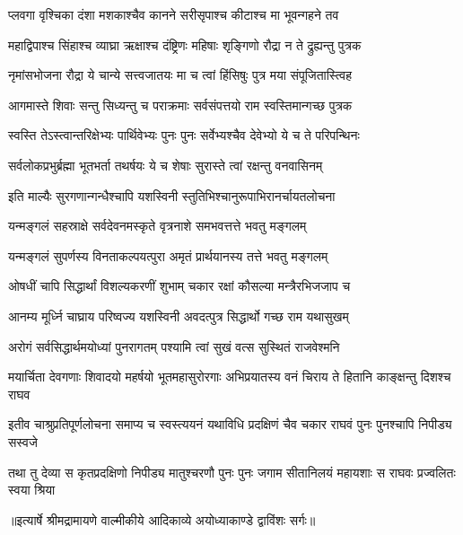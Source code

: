 \twolineshloka
{प्लवगा वृश्चिका दंशा मशकाश्चैव कानने}
{सरीसृपाश्च कीटाश्च मा भूवन्गहने तव} %

\twolineshloka
{महाद्विपाश्च सिंहाश्च व्याघ्रा ऋक्षाश्च दंष्ट्रिणः}
{महिषाः शृङ्गिणो रौद्रा न ते द्रुह्यन्तु पुत्रक} %

\twolineshloka
{नृमांसभोजना रौद्रा ये चान्ये सत्त्वजातयः}
{मा च त्वां हिंसिषुः पुत्र मया संपूजितास्त्विह} %

\twolineshloka
{आगमास्ते शिवाः सन्तु सिध्यन्तु च पराक्रमाः}
{सर्वसंपत्तयो राम स्वस्तिमान्गच्छ पुत्रक} %

\twolineshloka
{स्वस्ति तेऽस्त्वान्तरिक्षेभ्यः पार्थिवेभ्यः पुनः पुनः}
{सर्वेभ्यश्चैव देवेभ्यो ये च ते परिपन्थिनः} %

\twolineshloka
{सर्वलोकप्रभुर्ब्रह्मा भूतभर्ता तथर्षयः}
{ये च शेषाः सुरास्ते त्वां रक्षन्तु वनवासिनम्} %

\twolineshloka
{इति माल्यैः सुरगणान्गन्धैश्चापि यशस्विनी}
{स्तुतिभिश्चानुरूपाभिरानर्चायतलोचना} %

\twolineshloka
{यन्मङ्गलं सहस्राक्षे सर्वदेवनमस्कृते}
{वृत्रनाशे समभवत्तत्ते भवतु मङ्गलम्} %

\twolineshloka
{यन्मङ्गलं सुपर्णस्य विनताकल्पयत्पुरा}
{अमृतं प्रार्थयानस्य तत्ते भवतु मङ्गलम्} %

\twolineshloka
{ओषधीं चापि सिद्धार्थां विशल्यकरणीं शुभाम्}
{चकार रक्षां कौसल्या मन्त्रैरभिजजाप च} %

\twolineshloka
{आनम्य मूर्ध्नि चाघ्राय परिष्वज्य यशस्विनी}
{अवदत्पुत्र सिद्धार्थो गच्छ राम यथासुखम्} %

\twolineshloka
{अरोगं सर्वसिद्धार्थमयोध्यां पुनरागतम्}
{पश्यामि त्वां सुखं वत्स सुस्थितं राजवेश्मनि} %

\fourlineindentedshloka
{मयार्चिता देवगणाः शिवादयो}
{ महर्षयो भूतमहासुरोरगाः}
{अभिप्रयातस्य वनं चिराय ते}
{ हितानि काङ्क्षन्तु दिशश्च राघव} %

\fourlineindentedshloka
{इतीव चाश्रुप्रतिपूर्णलोचना}
{ समाप्य च स्वस्त्ययनं यथाविधि}
{प्रदक्षिणं चैव चकार राघवं}
{ पुनः पुनश्चापि निपीड्य सस्वजे} %

\fourlineindentedshloka
{तथा तु देव्या स कृतप्रदक्षिणो}
{ निपीड्य मातुश्चरणौ पुनः पुनः}
{जगाम सीतानिलयं महायशाः}
{ स राघवः प्रज्वलितः स्वया श्रिया} %


{॥इत्यार्षे श्रीमद्रामायणे वाल्मीकीये आदिकाव्ये अयोध्याकाण्डे द्वाविंशः सर्गः॥}


